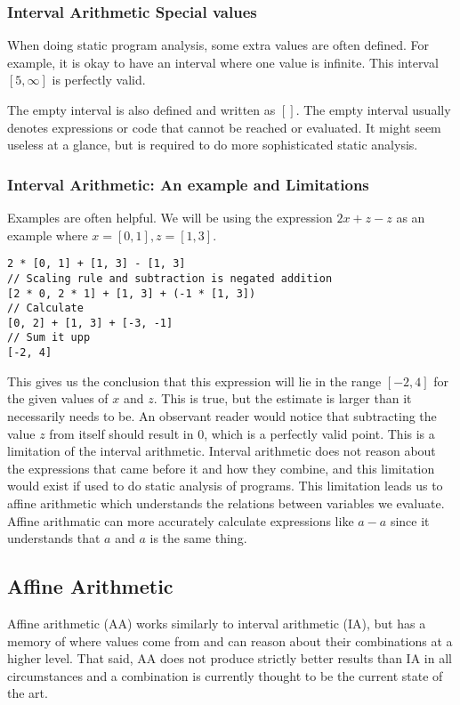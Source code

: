 \documentclass[msc,lith,english]{liuthesis}
\begin{document}
\subsubsection{Interval Arithmetic Special values}
When doing static program analysis, some extra values are often defined. For example, it is okay to have an interval where one value is infinite. This interval $[5, \infty]$ is perfectly valid.

The empty interval is also defined and written as $[]$. The empty interval usually denotes expressions or code that cannot be reached or evaluated. It might seem useless at a glance, but is required to do more sophisticated static analysis.

\subsubsection{Interval Arithmetic: An example and Limitations}
Examples are often helpful.
We will be using the expression $2x + z - z$ as an example where $x = [0, 1], z = [1, 3]$.

\begin{verbatim}
2 * [0, 1] + [1, 3] - [1, 3]
// Scaling rule and subtraction is negated addition 
[2 * 0, 2 * 1] + [1, 3] + (-1 * [1, 3])
// Calculate
[0, 2] + [1, 3] + [-3, -1]
// Sum it upp
[-2, 4]
\end{verbatim}

This gives us the conclusion that this expression will lie in the range $[-2, 4]$ for the given values of $x$ and $z$. This is true, but the estimate is larger than it necessarily needs to be. An observant reader would notice that subtracting the value $z$ from itself should result in $0$, which is a perfectly valid point. This is a limitation of the interval arithmetic. Interval arithmetic does not reason about the expressions that came before it and how they combine, and this limitation would exist if used to do static analysis of programs. This limitation leads us to affine arithmetic which understands the relations between variables we evaluate. Affine arithmatic can more accurately calculate expressions like $a - a$ since it understands that $a$ and $a$ is the same thing.


\subsection{Affine Arithmetic}
Affine arithmetic (AA) works similarly to interval arithmetic (IA), but has a memory of where values come from and can reason about their combinations at a higher level. That said, AA does not produce strictly better results than IA in all circumstances and a combination is currently thought to be the current state of the art. 
\end{document}
